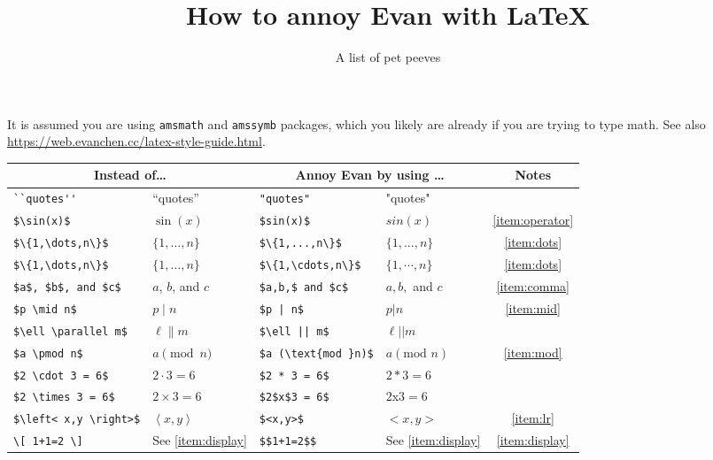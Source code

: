 \documentclass[10pt]{scrartcl}
\begin{document}
\title{How to annoy Evan with \LaTeX}
\subtitle{A list of pet peeves}
\maketitle

\bgroup\footnotesize
It is assumed you are using \texttt{amsmath} and \texttt{amssymb} packages,
which you likely are already if you are trying to type math.
See also \url{https://web.evanchen.cc/latex-style-guide.html}.
\egroup

\begin{center}
\begin{tabular}[h]{llllc}
  \toprule
  \multicolumn{2}{c}{Instead of\dots} & \multicolumn{2}{c}{Annoy Evan by using \dots} & Notes \\
  \midrule
  \verb#``quotes''# & ``quotes'' & \verb#"quotes"# & "quotes" & \\
  \verb#$\sin(x)$# & $\sin(x)$ & \verb#$sin(x)$# & $sin(x)$ & \eqref{item:operator} \\
  \verb#$\{1,\dots,n\}$# & $\{1,\dots,n\}$ & \verb#$\{1,...,n\}$# & $\{1,...,n\}$ & \eqref{item:dots} \\
  \verb#$\{1,\dots,n\}$# & $\{1,\dots,n\}$ & \verb#$\{1,\cdots,n\}$# & $\{1,\cdots,n\}$ & \eqref{item:dots} \\
  \verb#$a$, $b$, and $c$# & $a$, $b$, and $c$ & \verb#$a,b,$ and $c$# & $a,b,$ and $c$ & \eqref{item:comma} \\
  \verb#$p \mid n$# & $p \mid n$ & \verb#$p | n$# & $p | n$ & \eqref{item:mid} \\
  \verb#$\ell \parallel m$# & $\ell \parallel m$ & \verb#$\ell || m$# & $\ell || m$ & \\
  \verb#$a \pmod n$# & $a \pmod n$ & \verb#$a (\text{mod }n)$# & $a (\text{mod }n)$ & \eqref{item:mod} \\
  \verb#$2 \cdot 3 = 6$# & $2 \cdot 3 = 6$ & \verb#$2 * 3 = 6$# & $2 * 3 = 6$ & \\
  \verb#$2 \times 3 = 6$# & $2 \times 3 = 6$ & \verb#$2$x$3 = 6$# & $2$x$3 = 6$ & \\
  \verb#$\left< x,y \right>$# & $\left< x,y\right>$ & \verb#$<x,y>$# & $<x,y>$ & \eqref{item:lr} \\
  \verb#\[ 1+1=2 \]# & See \eqref{item:display} & \verb#$$1+1=2$$# & See \eqref{item:display} & \eqref{item:display} \\
  \bottomrule
\end{tabular}
\end{center}
\end{document}
